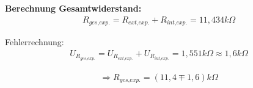 \documentclass[a4paper]{scrartcl}
\numberwithin{equation}{subsection}
\begin{document}
\textbf{Berechnung Gesamtwiderstand:}
\begin{align}
R_{\textit{ges,exp.}} = R_{\textit{ext,exp.}} + R_{\textit{int,exp.}} = 11,434k\Omega 
\end{align}

Fehlerrechnung:
\begin{align*}
U_{R_{\textit{ges,exp.}}} = U_{R_{\textit{ext,exp.}}} + U_{R_{\textit{int,exp.}}} = 1,551k\Omega \approx 1,6k\Omega
\end{align*}

\begin{align*}
\Rightarrow R_{\textit{ges,exp.}} = (11,4 \mp 1,6) k\Omega
\end{align*}
\end{document}

